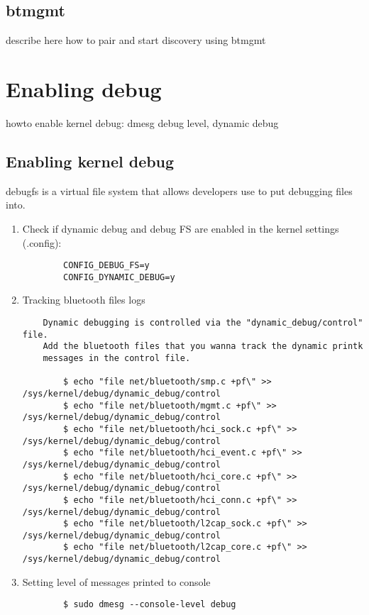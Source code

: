 \documentclass[11pt]{article}
\begin{document}
\subsection{btmgmt}
describe here how to pair and start discovery using btmgmt


\section{Enabling debug}

howto enable kernel debug: dmesg debug level, dynamic debug

\subsection{Enabling kernel debug}

debugfs is a virtual file system that allows developers use to put debugging files into.

\begin{enumerate}
	\item Check if dynamic debug and debug FS are enabled in the kernel settings (.config):

	\begin{verbatim}
		CONFIG_DEBUG_FS=y
		CONFIG_DYNAMIC_DEBUG=y
	\end{verbatim}

	\item Tracking bluetooth files logs

	\begin{verbatim}
	Dynamic debugging is controlled via the "dynamic_debug/control" file.
	Add the bluetooth files that you wanna track the dynamic printk
	messages in the control file.

		$ echo "file net/bluetooth/smp.c +pf\" >> /sys/kernel/debug/dynamic_debug/control
		$ echo "file net/bluetooth/mgmt.c +pf\" >> /sys/kernel/debug/dynamic_debug/control
		$ echo "file net/bluetooth/hci_sock.c +pf\" >> /sys/kernel/debug/dynamic_debug/control
		$ echo "file net/bluetooth/hci_event.c +pf\" >> /sys/kernel/debug/dynamic_debug/control
		$ echo "file net/bluetooth/hci_core.c +pf\" >> /sys/kernel/debug/dynamic_debug/control
		$ echo "file net/bluetooth/hci_conn.c +pf\" >> /sys/kernel/debug/dynamic_debug/control
		$ echo "file net/bluetooth/l2cap_sock.c +pf\" >> /sys/kernel/debug/dynamic_debug/control
		$ echo "file net/bluetooth/l2cap_core.c +pf\" >> /sys/kernel/debug/dynamic_debug/control
	\end{verbatim}

	\item Setting level of messages printed to console

		\begin{verbatim}
		$ sudo dmesg --console-level debug
		\end{verbatim}
\end{enumerate}
\end{document}
